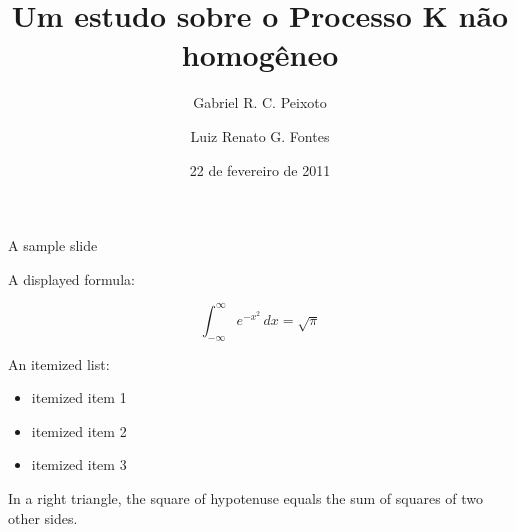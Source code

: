 \documentclass{beamer}
\title{Um estudo sobre o Processo K não homogêneo}
\author{Gabriel R. C. Peixoto \and Luiz Renato G. Fontes}
\date{22 de fevereiro de 2011}
\begin{document}
\maketitle

\begin{frame}{A sample slide}

A displayed formula:

\[
  \int_{-\infty}^\infty e^{-x^2} \, dx = \sqrt{\pi}
\]

An itemized list:

\begin{itemize}
  \item itemized item 1
  \item itemized item 2
  \item itemized item 3
\end{itemize}

\begin{theorem}
  In a right triangle, the square of hypotenuse equals
  the sum of squares of two other sides.
\end{theorem}

\end{frame}
\end{document}
